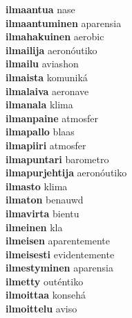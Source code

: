 \textbf{ilmaantua } nase \\
\textbf{ilmaantuminen } aparensia \\
\textbf{ilmahakuinen } aerobic \\
\textbf{ilmailija } aeronóutiko \\
\textbf{ilmailu } aviashon \\
\textbf{ilmaista } komuniká \\
\textbf{ilmalaiva } aeronave \\
\textbf{ilmanala } klima \\
\textbf{ilmanpaine } atmosfer \\
\textbf{ilmapallo } blaas \\
\textbf{ilmapiiri } atmosfer \\
\textbf{ilmapuntari } barometro \\
\textbf{ilmapurjehtija } aeronóutiko \\
\textbf{ilmasto } klima \\
\textbf{ilmaton } benauwd \\
\textbf{ilmavirta } bientu \\
\textbf{ilmeinen } kla \\
\textbf{ilmeisen } aparentemente \\
\textbf{ilmeisesti } evidentemente \\
\textbf{ilmestyminen } aparensia \\
\textbf{ilmetty } outéntiko \\
\textbf{ilmoittaa } konsehá \\
\textbf{ilmoittelu } aviso \\
